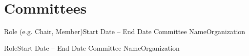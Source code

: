 \section{Committees}
  \resumeSubHeadingListStart

    \resumeSubheading
      {Role (e.g. Chair, Member)}{Start Date -- End Date}
      {Committee Name}{Organization}
      \resumeItemListStart
      \resumeItemListEnd

    \resumeSubheading
      {Role}{Start Date -- End Date}
      {Committee Name}{Organization}
      \resumeItemListStart
      \resumeItemListEnd

  \resumeSubHeadingListEnd
